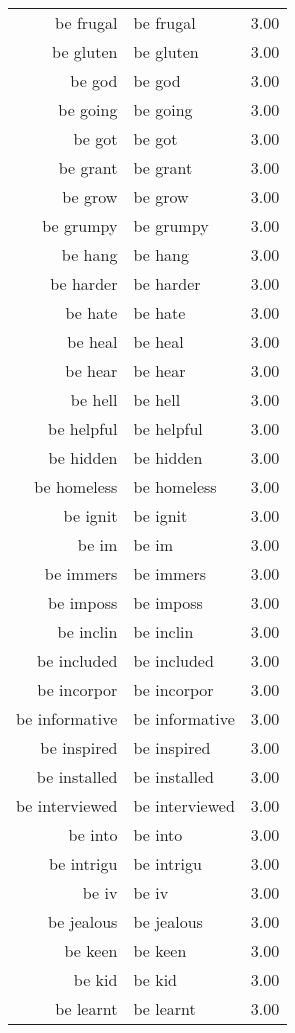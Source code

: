 \begin{table}[ht]
\begin{tabular}{rlr}
  be frugal & be frugal & 3.00 \\ 
  be gluten & be gluten & 3.00 \\ 
  be god & be god & 3.00 \\ 
  be going & be going & 3.00 \\ 
  be got & be got & 3.00 \\ 
  be grant & be grant & 3.00 \\ 
  be grow & be grow & 3.00 \\ 
  be grumpy & be grumpy & 3.00 \\ 
  be hang & be hang & 3.00 \\ 
  be harder & be harder & 3.00 \\ 
  be hate & be hate & 3.00 \\ 
  be heal & be heal & 3.00 \\ 
  be hear & be hear & 3.00 \\ 
  be hell & be hell & 3.00 \\ 
  be helpful & be helpful & 3.00 \\ 
  be hidden & be hidden & 3.00 \\ 
  be homeless & be homeless & 3.00 \\ 
  be ignit & be ignit & 3.00 \\ 
  be im & be im & 3.00 \\ 
  be immers & be immers & 3.00 \\ 
  be imposs & be imposs & 3.00 \\ 
  be inclin & be inclin & 3.00 \\ 
  be included & be included & 3.00 \\ 
  be incorpor & be incorpor & 3.00 \\ 
  be informative & be informative & 3.00 \\ 
  be inspired & be inspired & 3.00 \\ 
  be installed & be installed & 3.00 \\ 
  be interviewed & be interviewed & 3.00 \\ 
  be into & be into & 3.00 \\ 
  be intrigu & be intrigu & 3.00 \\ 
  be iv & be iv & 3.00 \\ 
  be jealous & be jealous & 3.00 \\ 
  be keen & be keen & 3.00 \\ 
  be kid & be kid & 3.00 \\ 
  be learnt & be learnt & 3.00 \\ 

\end{tabular}
\end{table}
